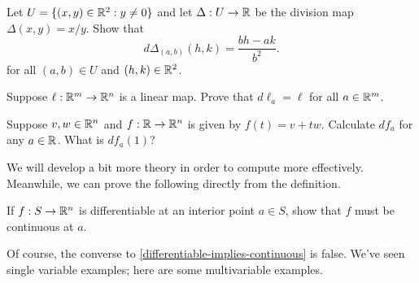 \begin{exercise} \label{derivative-of-division}
	Let $U = \{(x,y) \in \mathbb{R}^2 : y \neq 0\}$ and let $\Delta : U \to \mathbb{R}$ be the division map $\Delta(x, y) = x/y$. Show that 
	\[ d\Delta_{(a,b)}(h, k) = \frac{bh - ak}{b^2}. \]
	for all $(a, b) \in U$ and $(h,k) \in \mathbb{R}^2$. 
\end{exercise}

\begin{exercise} \label{derivative-of-linear}
	Suppose $\ell : \mathbb{R}^m \to \mathbb{R}^n$ is a linear map. Prove that $d\ell_a = \ell$ for all $a \in \mathbb{R}^m$.  
\end{exercise}

\begin{exercise} \label{derivative-of-line}
	Suppose $v, w \in \mathbb{R}^n$ and $f : \mathbb{R} \to \mathbb{R}^n$ is given by $f(t) = v + tw$. Calculate $df_a$ for any $a \in \mathbb{R}$. What is $df_a(1)$?
\end{exercise}

We will develop a bit more theory in order to compute more effectively. Meanwhile, we can prove the following directly from the definition. 

\begin{exercise} \label{differentiable-implies-continuous}
	If $f : S \to \mathbb{R}^n$ is differentiable at an interior point $a \in S$, show that $f$ must be continuous at $a$. 
\end{exercise}

Of course, the converse to \cref{differentiable-implies-continuous} is false. We've seen single variable examples; here are some multivariable examples. 

